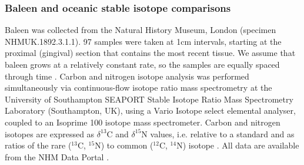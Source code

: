 \documentclass[a4paper,12pt]{article}
\begin{document}
\subsubsection{Baleen and oceanic stable isotope comparisons}
Baleen was collected from the Natural History Museum, London (specimen NHMUK.1892.3.1.1).  
97 samples were taken at 1cm intervals, starting at the proximal (gingival) section that contains the most recent tissue. 
We assume that baleen grows at a relatively constant rate, so the samples are equally spaced through time \cite{best1996stable}. 
Carbon and nitrogen isotope analysis was performed simultaneously via continuous-flow isotope ratio mass spectrometry at the University of Southampton SEAPORT Stable Isotope Ratio Mass Spectrometry Laboratory (Southampton, UK), using a Vario Isotope select elemental analyser, coupled to an Isoprime 100 isotope mass spectrometer. 
Carbon and nitrogen isotopes are expressed as $\delta^{13}$C and $\delta^{15}$N values, i.e. relative to a standard and as ratios of the rare ($^{13}$C, $^{15}$N) to common ($^{12}$C, $^{14}$N) isotope \cite{west2006stable}.
All data are available from the NHM Data Portal \cite{data-set}.
 
\end{document}
